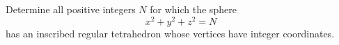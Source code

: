 Determine all positive integers $N$ for which the sphere
\[
x^2 + y^2 + z^2 = N
\]
has an inscribed regular tetrahedron whose vertices have integer coordinates.
